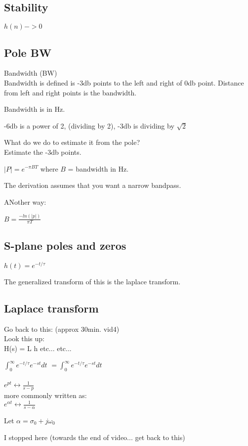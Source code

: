 \subsection*{Stability}

$h(n) -> 0$





\subsection*{Pole BW}

Bandwidth (BW) \\

Bandwidth is defined is -3db points to the left and right of 0db point. 
Distance from left and right points is the bandwidth.

Bandwidth is in Hz. 

-6db is a power of 2, (dividing by 2), -3db is dividing by $\sqrt{2}$

What do we do to estimate it from the pole?
\\
Estimate the -3db points. 

$|P| = e^{-\pi B T}$
where $B$ = bandwidth in Hz.

The derivation assumes that you want a narrow bandpass.

ANother way:

$B = \frac{-ln(|p|)}{\pi T}$


\subsection*{S-plane poles and zeros}
$h(t) = e^{-t/\tau}$

The generalized transform of this is the laplace transform.

\subsection*{Laplace transform}
Go back to this: (approx 30min. vid4)\\
Look this up:\\
H(s) = L h etc... etc...

$\int_0^{\infty} e^{-t/\tau}e^{-st}dt$
$= \int_0^{\infty} e^{-t/\tau}e^{-st}dt$ \\\\

$e^{pt} \leftrightarrow \frac{1}{s - p}$
\\
more commonly written as: \\
$e^{\alpha t} \leftrightarrow \frac{1}{s - \alpha}$\\

Let $\alpha = \sigma_0 + j\omega_0$

I stopped here (towards the end of video... get back to this)



